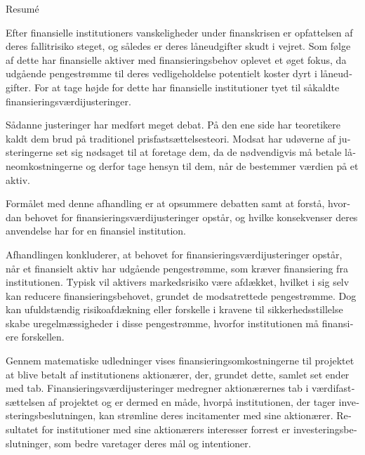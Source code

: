 \documentclass[main.tex]{subfiles}
\begin{document}
    \begin{otherlanguage}{danish}
    \thispagestyle{empty}
    \begin{center}
    {\LARGE Resumé}
    \end{center}

    Efter finansielle institutioners vanskeligheder under finanskrisen 
    er opfattelsen af deres fallitrisiko steget, og således er deres låneudgifter skudt i vejret.
    Som følge af dette har finansielle aktiver med finansieringsbehov oplevet et øget fokus, 
    da udgående pengestrømme til deres vedligeholdelse potentielt koster dyrt i låneudgifter.
    For at tage højde for dette
    har finansielle institutioner tyet til såkaldte finansieringsværdijusteringer.

    Sådanne justeringer har medført meget debat. 
    På den ene side har teoretikere kaldt dem brud på traditionel prisfastsættelsesteori.
    Modsat har udøverne af justeringerne set sig nødsaget til at foretage dem,
    da de nødvendigvis må betale låneomkostningerne 
    og derfor tage hensyn til dem, når de bestemmer værdien på et aktiv. 

    Formålet med denne afhandling er at opsummere debatten
    samt at forstå, hvordan behovet for finansieringsværdijusteringer opstår, 
    og hvilke konsekvenser deres anvendelse har for en finansiel institution. 

    Afhandlingen konkluderer, at behovet for finansieringsværdijusteringer opstår, 
    når et finansielt aktiv har udgående pengestrømme, som kræver finansiering fra institutionen.
    Typisk vil aktivers markedsrisiko være afdækket,
    hvilket i sig selv kan reducere finansieringsbehovet, grundet de modsatrettede pengestrømme.
    Dog kan ufuldstændig risikoafdækning eller forskelle i kravene til sikkerhedsstillelse
    skabe uregelmæssigheder i disse pengestrømme, hvorfor institutionen må finansiere forskellen.
    
    Gennem matematiske udledninger vises finansieringsomkostningerne til projektet
    at blive betalt af institutionens aktionærer,
    der, grundet dette, samlet set ender med tab.
    Finansieringsværdijusteringer medregner aktionærernes tab i værdifastsættelsen af projektet
    og er dermed en måde, hvorpå institutionen, der tager investeringsbeslutningen, 
    kan strømline deres incitamenter med sine aktionærer. 
    Resultatet for institutioner med sine aktionærers interesser forrest
    er investeringsbeslutninger, som bedre varetager deres mål og intentioner.
    
    \end{otherlanguage}
\end{document}
